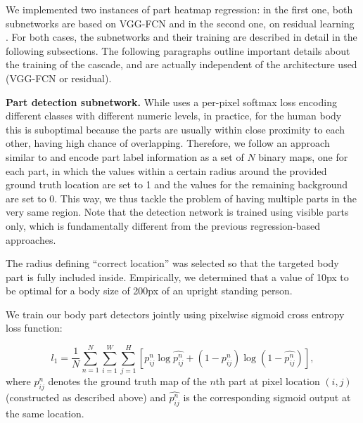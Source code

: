 \documentclass[runningheads]{llncs}
\begin{document}
We implemented two instances of part heatmap regression: in the first one, both subnetworks are based on VGG-FCN \cite{simonyan2014very, long2015fully} and in the second one, on residual learning \cite{he2016deep, newell2016stacked}. For both cases, the subnetworks and their training are described in detail in the following subsections. The following paragraphs outline important details about the training of the cascade, and are actually independent of the architecture used (VGG-FCN or residual). 

\textbf{Part detection subnetwork.} While \cite{long2015fully} uses a per-pixel softmax loss encoding different classes with different numeric levels, in practice, for the human body this is suboptimal because the parts are usually within close proximity  to each other, having high chance of overlapping. Therefore, we follow an approach similar to \cite{zhang2015fine} and encode part label information as a set of $N$ binary maps, one for each part, in which the values within a certain radius around the provided ground truth location are set to 1 and the values for the remaining background are set to 0. This way, we thus tackle the problem of having multiple parts in the very same region. Note that the detection network is trained using visible parts only, which is fundamentally different from the previous regression-based approaches\cite{pfister2015flowing,tompson2014joint,tompson2015efficient}.

The radius defining ``correct location'' was selected so that the targeted body part is fully included inside. Empirically, we determined that a value of 10px to be optimal for a body size of 200px of an upright standing person.

We train our body part detectors jointly using pixelwise sigmoid cross entropy loss function:

\begin{equation}
	 l_1 = \dfrac{1}{N} \sum\limits_{n=1}^{N} \sum\limits_{i=1}^{W} \sum\limits_{j=1}^{H}[p_{ij}^n\log \hat{p_{ij}^n}+(1-p_{ij}^n)\log(1-\hat{p_{ij}^n})],
\end{equation}
where $ p_{ij}^n $ denotes the ground truth map of the $ n $th part at pixel location $ (i,j) $ (constructed as described above) and $ \hat{p_{ij}^n} $ is the corresponding sigmoid output at the same location.
\end{document}

